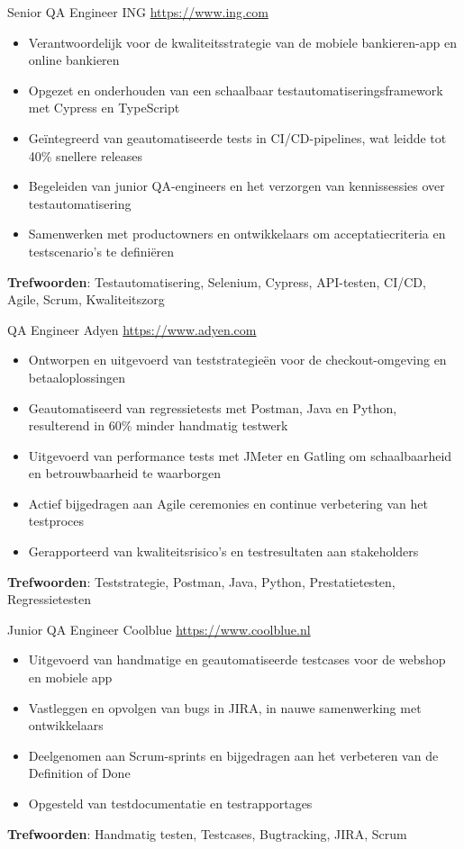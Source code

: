 \documentclass[a4paper, serif, 10pt]{moderncv}
\begin{document}
        {Senior QA Engineer}
        {ING}
        {\url{https://www.ing.com}}
        {}
        {\begin{itemize}
\item Verantwoordelijk voor de kwaliteitsstrategie van de mobiele bankieren-app en online bankieren
\item Opgezet en onderhouden van een schaalbaar testautomatiseringsframework met Cypress en TypeScript
\item Geïntegreerd van geautomatiseerde tests in CI/CD-pipelines, wat leidde tot 40\% snellere releases
\item Begeleiden van junior QA-engineers en het verzorgen van kennissessies over testautomatisering
\item Samenwerken met productowners en ontwikkelaars om acceptatiecriteria en testscenario's te definiëren
\end{itemize}
\textbf{Trefwoorden}: Testautomatisering, Selenium, Cypress, API-testen, CI/CD, Agile, Scrum, Kwaliteitszorg}

        {QA Engineer}
        {Adyen}
        {\url{https://www.adyen.com}}
        {}
        {\begin{itemize}
\item Ontworpen en uitgevoerd van teststrategieën voor de checkout-omgeving en betaaloplossingen
\item Geautomatiseerd van regressietests met Postman, Java en Python, resulterend in 60\% minder handmatig testwerk
\item Uitgevoerd van performance tests met JMeter en Gatling om schaalbaarheid en betrouwbaarheid te waarborgen
\item Actief bijgedragen aan Agile ceremonies en continue verbetering van het testproces
\item Gerapporteerd van kwaliteitsrisico's en testresultaten aan stakeholders
\end{itemize}
\textbf{Trefwoorden}: Teststrategie, Postman, Java, Python, Prestatietesten, Regressietesten}

        {Junior QA Engineer}
        {Coolblue}
        {\url{https://www.coolblue.nl}}
        {}
        {\begin{itemize}
\item Uitgevoerd van handmatige en geautomatiseerde testcases voor de webshop en mobiele app
\item Vastleggen en opvolgen van bugs in JIRA, in nauwe samenwerking met ontwikkelaars
\item Deelgenomen aan Scrum-sprints en bijgedragen aan het verbeteren van de Definition of Done
\item Opgesteld van testdocumentatie en testrapportages
\end{itemize}
\textbf{Trefwoorden}: Handmatig testen, Testcases, Bugtracking, JIRA, Scrum}
\end{document}
